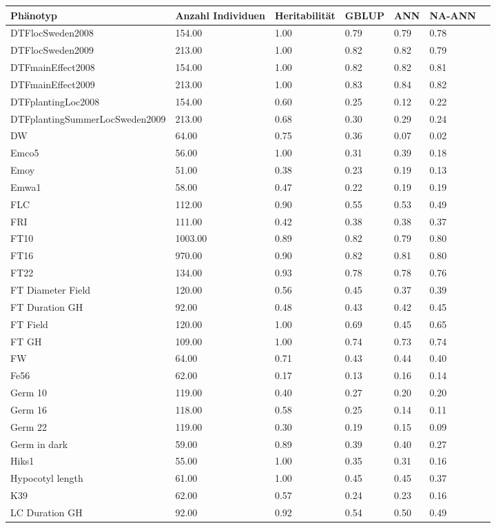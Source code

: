 \documentclass[ngerman,onecolumn,bibliography=totocnumbered]{scrreprt}
\begin{document}
\begin{table}[]
\begin{tabular}{|l|l|l|l|l|l|l|}
\hline
Phänotyp 					& Anzahl Individuen & Heritabilität & GBLUP & ANN 	 & NA-ANN \\ \hline
DTFlocSweden2008  & 154.00  & 1.00  & 0.79  & 0.79  & 0.78 \\ \hline
DTFlocSweden2009  & 213.00  & 1.00  & 0.82  & 0.82  & 0.79 \\ \hline
DTFmainEffect2008  & 154.00  & 1.00  & 0.82  & 0.82  & 0.81 \\ \hline
DTFmainEffect2009  & 213.00  & 1.00  & 0.83  & 0.84  & 0.82 \\ \hline
DTFplantingLoc2008  & 154.00  & 0.60  & 0.25  & 0.12  & 0.22 \\ \hline
DTFplantingSummerLocSweden2009  & 213.00  & 0.68  & 0.30  & 0.29  & 0.24 \\ \hline
DW   & 64.00  & 0.75  & 0.36  & 0.07  & 0.02 \\ \hline
Emco5  & 56.00  & 1.00  & 0.31  & 0.39  & 0.18 \\ \hline
Emoy  & 51.00  & 0.38  & 0.23  & 0.19  & 0.13 \\ \hline
Emwa1  & 58.00  & 0.47  & 0.22  & 0.19  & 0.19 \\ \hline
FLC  & 112.00  & 0.90  & 0.55  & 0.53  & 0.49 \\ \hline
FRI  & 111.00  & 0.42  & 0.38  & 0.38  & 0.37 \\ \hline
FT10  & 1003.00  & 0.89  & 0.82  & 0.79  & 0.80 \\ \hline
FT16  & 970.00  & 0.90  & 0.82  & 0.81  & 0.80 \\ \hline
FT22  & 134.00  & 0.93  & 0.78  & 0.78  & 0.76 \\ \hline
FT Diameter Field  & 120.00  & 0.56  & 0.45  & 0.37  & 0.39 \\ \hline
FT Duration GH  & 92.00  & 0.48  & 0.43  & 0.42  & 0.45 \\ \hline
FT Field  & 120.00  & 1.00  & 0.69  & 0.45  & 0.65 \\ \hline
FT GH  & 109.00  & 1.00  & 0.74  & 0.73  & 0.74 \\ \hline
FW   & 64.00  & 0.71  & 0.43  & 0.44  & 0.40 \\ \hline
Fe56  & 62.00  & 0.17  & 0.13  & 0.16  & 0.14 \\ \hline
Germ 10  & 119.00  & 0.40  & 0.27  & 0.20  & 0.20 \\ \hline
Germ 16  & 118.00  & 0.58  & 0.25  & 0.14  & 0.11 \\ \hline
Germ 22  & 119.00  & 0.30  & 0.19  & 0.15  & 0.09 \\ \hline
Germ in dark  & 59.00  & 0.89  & 0.39  & 0.40  & 0.27 \\ \hline
Hiks1  & 55.00  & 1.00  & 0.35  & 0.31  & 0.16 \\ \hline
Hypocotyl length  & 61.00  & 1.00  & 0.45  & 0.45  & 0.37 \\ \hline
K39  & 62.00  & 0.57  & 0.24  & 0.23  & 0.16 \\ \hline
LC Duration GH  & 92.00  & 0.92  & 0.54  & 0.50  & 0.49 \\ \hline
\end{tabular}
\end{table}
\end{document}
